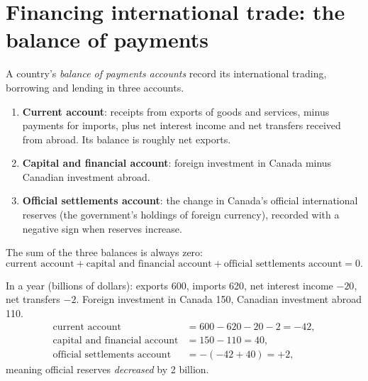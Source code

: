 \section{Financing international trade: the balance of payments}

\begin{definition}
A country's \emph{balance of payments accounts} record its international trading,
borrowing and lending in three accounts.
\begin{enumerate}
  \item \textbf{Current account}: receipts from exports of goods and services, minus
        payments for imports, plus net interest income and net transfers received from
        abroad. Its balance is roughly net exports.
  \item \textbf{Capital and financial account}: foreign investment in Canada minus
        Canadian investment abroad.
  \item \textbf{Official settlements account}: the change in Canada's official
        international reserves (the government's holdings of foreign currency), recorded
        with a negative sign when reserves increase.
\end{enumerate}
The sum of the three balances is always zero:
\[
  \text{current account} + \text{capital and financial account} +
  \text{official settlements account} = 0.
\]
\end{definition}

\begin{example}
In a year (billions of dollars): exports 600, imports 620, net interest income $-20$,
net transfers $-2$. Foreign investment in Canada 150, Canadian investment abroad 110.
\begin{align*}
  \text{current account} &= 600 - 620 - 20 - 2 = -42,\\
  \text{capital and financial account} &= 150 - 110 = 40,\\
  \text{official settlements account} &= -(-42 + 40) = +2,
\end{align*}
meaning official reserves \emph{decreased} by 2 billion.
\end{example}

\begin{center}
\end{center}

